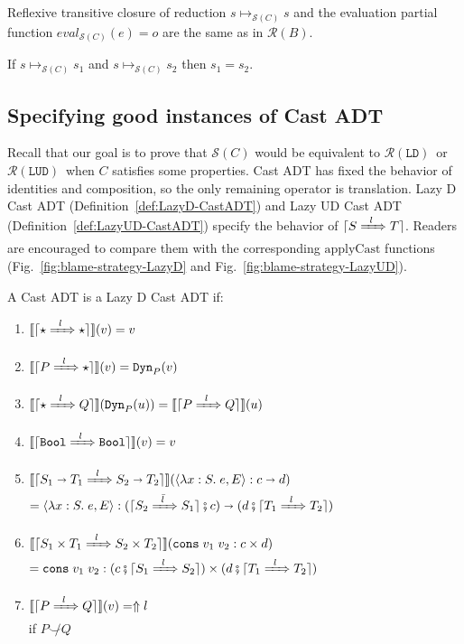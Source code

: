 \documentclass[runningheads]{llncs}
\newcommand{\RMachine}[1]{\ensuremath{\mathcal{R}(#1)}}
\newcommand{\LDMachine}{\RMachine{\BLD}}
\newcommand{\LUDMachine}{\RMachine{\BLUD}}
\newcommand{\SMachine}[1]{\ensuremath{\mathcal{S}(#1)}}
\newcommand{\error}[1]{\ensuremath{\Uparrow#1}}
\newcommand{\Tdyn}[0]{\ensuremath{\star}}
\newcommand{\Pbool}[0]{\ensuremath{\mathtt{Bool}}}
\newcommand{\Pfunc}[2]{\ensuremath{#1 \shortrightarrow #2}}
\newcommand{\Pprod}[2]{\ensuremath{#1 \times #2}}
\newcommand{\elam}[3]{\lambda#1:#2.\;#3}
\newcommand{\econs}[2]{\mathtt{cons} \; #1 \; #2}
\newcommand{\ecast}[2]{\ensuremath{#1 : #2}}
\newcommand{\ccast}[3]{#1 \xRightarrow[]{\enskip #2 \enskip} #3}
\newcommand{\vdyn}[2]{\mathtt{Dyn}_{#1}(#2)}
\newcommand{\vfunc}[4]{\langle\elam{#1}{#2}{#3},#4\rangle}
\newcommand{\vcons}[2]{\econs{#1}{#2}}
\newcommand{\BLD}[0]{\ensuremath{\mathtt{LD}}}
\newcommand{\BLUD}[0]{\ensuremath{\mathtt{LUD}}}
\newcommand{\denote}[1]{\ensuremath{\llbracket #1 \rrbracket}}
\newcommand{\compose}[2]{\ensuremath{#1 \fatsemi #2}}
\newcommand{\translate}[1]{\ensuremath{\lceil#1\rceil}}
\newcommand{\notshallowlyconsistent}[2]{\ensuremath{#1\not\smile#2}}
\newcommand{\reducetoS}[3]{\ensuremath{#2 \longmapsto_{\SMachine{#1}} #3}}
\newcommand{\evaltoS}[3]{\ensuremath{\mathit{eval}_{\SMachine{#1}}(#2)=#3}}
\begin{document}
Reflexive transitive closure of reduction $\reducetoS{C}{s}{s}$ and
the evaluation partial function $\evaltoS{C}{e}{o}$ are the same as in \RMachine{B}.

\begin{proposition}[\SMachine{C} is deterministic]
	\label{prop:SEMachine-deterministic}
	If $\reducetoS{C}{s}{s_1}$ and $\reducetoS{C}{s}{s_2}$ 
	then $s_1 = s_2$.
\end{proposition}

\subsection{Specifying good instances of Cast ADT} \label{sec:good-cast-adt}

Recall that our goal is to prove that \SMachine{C} would be equivalent to
\LDMachine\ or \LUDMachine\ when $C$ satisfies some properties.
Cast ADT has fixed the behavior of identities and composition, so the only 
remaining operator is translation.
%
Lazy D Cast ADT (Definition~\ref{def:LazyD-CastADT}) and Lazy UD Cast ADT 
(Definition~\ref{def:LazyUD-CastADT}) specify the behavior 
of \translate{\ccast{S}{l}{T}}. Readers are encouraged to compare them with the 
corresponding $\mathrm{applyCast}$ functions 
(Fig.~\ref{fig:blame-strategy-LazyD} and 
Fig.~\ref{fig:blame-strategy-LazyUD}).

\begin{definition}
	\label{def:LazyD-CastADT}
	A Cast ADT is a Lazy D Cast ADT if:
	\begin{enumerate}
		\item $\denote{\translate{\ccast{\Tdyn}{l}{\Tdyn}}}(v) = v$
		\item $\denote{\translate{\ccast{P}{l}{\Tdyn}}}(v) = \vdyn{P}{v}$
		\item $\denote{\translate{\ccast{\Tdyn}{l}{Q}}}(\vdyn{P}{u}) = 
		\denote{\translate{\ccast{P}{l}{Q}}}(u)$
		\item $\denote{\translate{\ccast{\Pbool}{l}{\Pbool}}}(v) = v$
		\item 
		$\denote{\translate{\ccast{\Pfunc{S_1}{T_1}}{l}{\Pfunc{S_2}{T_2}}}}(
			\ecast{\vfunc{x}{S}{e}{E}}{\Pfunc{c}{d}})$\\
		$=
		\ecast{\vfunc{x}{S}{e}{E}}{
			\Pfunc{
				(\compose{\translate{\ccast{S_2}{\bar{l}}{S_1}}}{c})}{
				(\compose{d}{\translate{\ccast{T_1}{l}{T_2}}})}}$
		\item 
		$\denote{\translate{\ccast{\Pprod{S_1}{T_1}}{l}{\Pprod{S_2}{T_2}}}}(
		\ecast{\vcons{v_1}{v_2}}{\Pprod{c}{d}})$\\
		$=
		\ecast{\vcons{v_1}{v_2}}{
			\Pprod{
				(\compose{c}{\translate{\ccast{S_1}{l}{S_2}}})}{
				(\compose{d}{\translate{\ccast{T_1}{l}{T_2}}})}}$
		\item $\denote{\translate{\ccast{P}{l}{Q}}}(v) = \error{l}$\\
			if $\notshallowlyconsistent{P}{Q}$
	\end{enumerate}
\end{definition}
\end{document}
